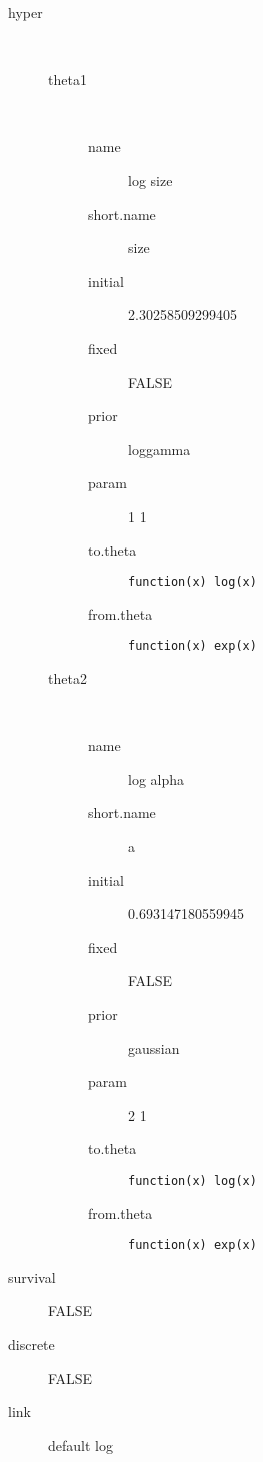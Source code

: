 \begin{description}
	\item[hyper]\ 
	 \begin{description}
	 	\item[theta1]\ 
	 	 \begin{description}
	 	 	 \item[ name ] log size 
	 	 	 \item[ short.name ] size 
	 	 	 \item[ initial ] 2.30258509299405 
	 	 	 \item[ fixed ] FALSE 
	 	 	 \item[ prior ] loggamma 
	 	 	 \item[ param ] 1 1 
	 	 	 \item[ to.theta ] \verb|function(x) log(x)| 
	 	 	 \item[ from.theta ] \verb|function(x) exp(x)| 
	 	 \end{description}
	 	\item[theta2]\ 
	 	 \begin{description}
	 	 	 \item[ name ] log alpha 
	 	 	 \item[ short.name ] a 
	 	 	 \item[ initial ] 0.693147180559945 
	 	 	 \item[ fixed ] FALSE 
	 	 	 \item[ prior ] gaussian 
	 	 	 \item[ param ] 2 1 
	 	 	 \item[ to.theta ] \verb|function(x) log(x)| 
	 	 	 \item[ from.theta ] \verb|function(x) exp(x)| 
	 	 \end{description}
	 \end{description}
	 \item[ survival ] FALSE 
	 \item[ discrete ] FALSE 
	 \item[ link ] default log 
\end{description}
